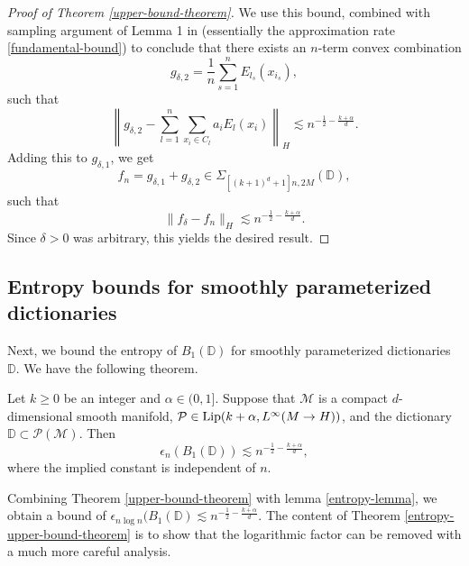 \begin{proof}[Proof of Theorem \ref{upper-bound-theorem}]
 We use this bound, combined with sampling argument of Lemma 1 in \cite{barron1993universal} (essentially the approximation rate \eqref{fundamental-bound}) to conclude that there exists an $n$-term convex combination
 \begin{equation}
  g_{\delta,2} = \frac{1}{n}\sum_{s=1}^n E_{l_s}(x_{i_s}),
 \end{equation}
such that
 \begin{equation}
  \left\|g_{\delta,2} -  \sum_{l=1}^{n}\sum_{x_{i}\in C_l}a_{i}E_l(x_{i})\right\|_H \lesssim n^{-\frac{1}{2}-\frac{k+\alpha}{d}}.
 \end{equation}
 Adding this to $g_{\delta,1}$, we get
 \begin{equation}
  f_n = g_{\delta,1} + g_{\delta,2}\in \Sigma_{[(k+1)^d+1]n,2M}(\mathbb{D}),
 \end{equation}
 such that
 \begin{equation}
  \|f_\delta - f_n\|_H \lesssim n^{-\frac{1}{2}-\frac{k+\alpha}{d}}.
 \end{equation}
 Since $\delta > 0$ was arbitrary, this yields the desired result.

\end{proof}

\subsection*{Entropy bounds for smoothly parameterized dictionaries}
Next, we bound the entropy of $B_1(\mathbb{D})$ for smoothly parameterized dictionaries $\mathbb{D}$. We have the following theorem.
\begin{theorem}\label{entropy-upper-bound-theorem}
 Let $k \geq 0$ be an integer and $\alpha\in (0,1]$. Suppose that $\mathcal{M}$ is a compact $d$-dimensional smooth manifold, $\mathcal{P}\in {\rm Lip}(k+\alpha, L^\infty(M\rightarrow H))$, and the dictionary $\mathbb{D}\subset \mathcal{P}(\mathcal{M})$. Then
 \begin{equation}\label{entropy-bound-equation}
 \epsilon_n(B_1(\mathbb{D})) \lesssim n^{-\frac{1}{2} - \frac{k+\alpha}{d}},
 \end{equation}
 where the implied constant is independent of $n$.
\end{theorem}
Combining Theorem \ref{upper-bound-theorem} with lemma \ref{entropy-lemma}, we obtain a bound of $\epsilon_{n\log{n}}(B_1(\mathbb{D}) \lesssim n^{-\frac{1}{2} - \frac{k+\alpha}{d}}$. The content of Theorem \ref{entropy-upper-bound-theorem} is to show that the logarithmic factor can be removed with a much more careful analysis.

